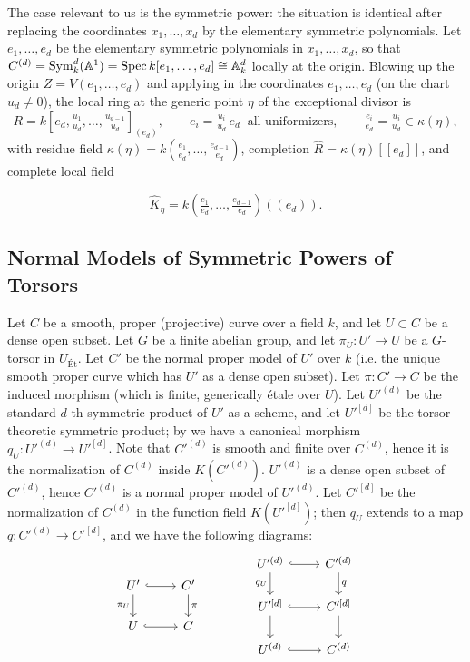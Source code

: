 The case relevant to us is the symmetric power: the situation is identical
after replacing the coordinates $x_1, \dots, x_d$ by the elementary symmetric
polynomials. Let $e_1, \dots, e_d$ be the elementary symmetric polynomials in
$x_1, \dots, x_d$, so that $C^{(d)} = \operatorname{Sym}^d_k(\mathbb{A}^1) = \operatorname{Spec} k[e_1, \dots, e_d] \cong \mathbb{A}^d_k$
locally at the origin. Blowing up the origin $Z = V(e_1, \dots, e_d)$ and applying
 in the coordinates $e_1, \dots, e_d$ (on the chart $u_d \neq 0$), the local
ring at the generic point $\eta$ of the exceptional divisor is
\[
R = k\left[e_d, \tfrac{u_1}{u_d}, \dots, \tfrac{u_{d-1}}{u_d}\right]_{(e_d)},
\qquad e_i = \tfrac{u_i}{u_d}\, e_d \ \text{ all uniformizers},
\qquad \tfrac{e_i}{e_d} = \tfrac{u_i}{u_d} \in \kappa(\eta),
\]
with residue field $\kappa(\eta) = k(\frac{e_1}{e_d}, \dots, \frac{e_{d-1}}{e_d})$,
completion $\hat{R} = \kappa(\eta)[[e_d]]$, and complete local field

\begin{equation}\label{eq:complete_field_at_generic_point}
     \widehat{K}_\eta = k\left(\tfrac{e_1}{e_d}, \dots, \tfrac{e_{d-1}}{e_d}\right)((e_d)).
\end{equation}

\subsection*{Normal Models of Symmetric Powers of Torsors}

Let $C$ be a smooth, proper (projective) curve over a field $k$, and let $U \subset C$ be a dense open subset.
Let $G$ be a finite abelian group, and let $\pi_U: U' \to U$ be a $G$-torsor in $U_{\text{\'Et}}$.
Let $C'$ be the normal proper model of $U'$ over $k$ (i.e. the unique smooth proper curve which has $U'$ as a dense open subset).
Let $\pi: C' \to C$ be the induced morphism (which is finite, generically \'etale over $U$).
Let $U'^{(d)}$ be the standard $d$-th symmetric product of $U'$ as a scheme, and let $U'^{[d]}$ be the torsor-theoretic symmetric product;
by  we have a canonical morphism $q_U: U'^{(d)} \to U'^{[d]}$.
Note that $C'^{(d)}$ is smooth and finite over $C^{(d)}$, hence it is the normalization of $C^{(d)}$ inside $K(C'^{(d)})$.
$U'^{(d)}$ is a dense open subset of $C'^{(d)}$, hence $C'^{(d)}$ is a normal proper model of $U'^{(d)}$.
Let $C'^{[d]}$ be the normalization of $C^{(d)}$ in the function field $K(U'^{[d]})$;
then $q_U$ extends to a map $q: C'^{(d)} \to C'^{[d]}$, and we have the following diagrams:
\[
\begin{tikzcd}
	U' \arrow[r, hook] \arrow[d, "\pi_U"'] & C' \arrow[d, "\pi"] \\
	U \arrow[r, hook] & C
\end{tikzcd}
\qquad \qquad
\begin{tikzcd}
	{U'^{(d)}} \arrow[r, hook] \arrow[d, "q_U"'] & {C'^{(d)}} \arrow[d, "q"] \\
	{U'^{[d]}} \arrow[r, hook] \arrow[d] & {C'^{[d]}} \arrow[d] \\
	{U^{(d)}} \arrow[r, hook] & {C^{(d)}}
\end{tikzcd}
\]

